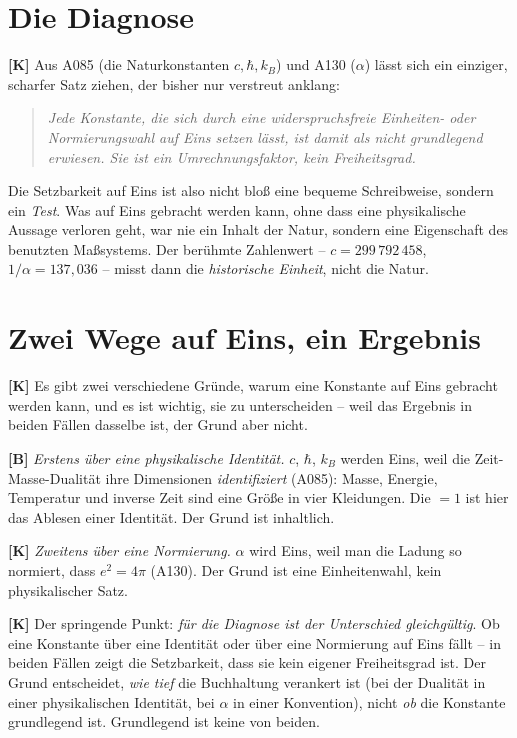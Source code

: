 \section{Die Diagnose}

\textbf{[K]} Aus A085 (die Naturkonstanten $c, \hbar, k_B$) und A130 ($\alpha$)
lässt sich ein einziger, scharfer Satz ziehen, der bisher nur verstreut
anklang:
\begin{quote}
\emph{Jede Konstante, die sich durch eine widerspruchsfreie Einheiten- oder
Normierungswahl auf Eins setzen lässt, ist damit als \emph{nicht grundlegend}
erwiesen. Sie ist ein Umrechnungsfaktor, kein Freiheitsgrad.}
\end{quote}

Die Setzbarkeit auf Eins ist also nicht bloß eine bequeme Schreibweise, sondern
ein \emph{Test}. Was auf Eins gebracht werden kann, ohne dass eine physikalische
Aussage verloren geht, war nie ein Inhalt der Natur, sondern eine Eigenschaft
des benutzten Maßsystems. Der berühmte Zahlenwert -- $c = 299\,792\,458$,
$1/\alpha = 137{,}036$ -- misst dann die \emph{historische Einheit}, nicht die
Natur.

\section{Zwei Wege auf Eins, ein Ergebnis}

\textbf{[K]} Es gibt zwei verschiedene Gründe, warum eine Konstante auf Eins
gebracht werden kann, und es ist wichtig, sie zu unterscheiden -- weil das
Ergebnis in beiden Fällen dasselbe ist, der Grund aber nicht.

\textbf{[B]} \emph{Erstens über eine physikalische Identität.} $c$, $\hbar$,
$k_B$ werden Eins, weil die Zeit-Masse-Dualität ihre Dimensionen
\emph{identifiziert} (A085): Masse, Energie, Temperatur und inverse Zeit sind
eine Größe in vier Kleidungen. Die $=1$ ist hier das Ablesen einer Identität.
Der Grund ist inhaltlich.

\textbf{[K]} \emph{Zweitens über eine Normierung.} $\alpha$ wird Eins, weil man
die Ladung so normiert, dass $e^2 = 4\pi$ (A130). Der Grund ist eine
Einheitenwahl, kein physikalischer Satz.

\textbf{[K]} Der springende Punkt: \emph{für die Diagnose ist der Unterschied
gleichgültig}. Ob eine Konstante über eine Identität oder über eine Normierung
auf Eins fällt -- in beiden Fällen zeigt die Setzbarkeit, dass sie kein eigener
Freiheitsgrad ist. Der Grund entscheidet, \emph{wie tief} die Buchhaltung
verankert ist (bei der Dualität in einer physikalischen Identität, bei
$\alpha$ in einer Konvention), nicht \emph{ob} die Konstante grundlegend ist.
Grundlegend ist keine von beiden.

